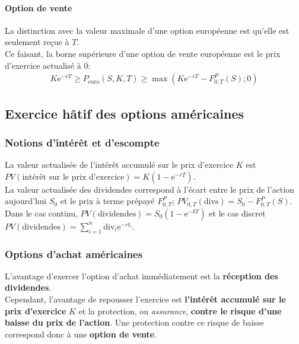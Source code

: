\documentclass[10pt, french]{article}
\begin{document}
\begin{multicols*}{2}
\paragraph{Option de vente}	La distinction avec la valeur maximale d'une option européenne est qu'elle est seulement reçue à $T$.\\

Ce faisant, \textcolor{cobalt}{la borne supérieure d'une option de vente européenne est le prix d'exercice actualisé à 0}:
\begin{align*}
	K \textrm{e}^{-rT}
	\geq	P_{\text{euro}}(S, K, T)
	\geq	\max\left(K\textrm{e}^{-rT} - F_{0, T}^{P}(S); 0\right)
\end{align*}

\columnbreak
\subsection{Exercice hâtif des options américaines}
\subsubsection*{Notions d'intérêt et d'escompte}
La valeur actualisée de l'intérêt accumulé sur le prix d'exercice $K$ est $PV(\text{intérêt sur le prix d'exercice}) = K(1 - \textrm{e}^{-rT})$.\\

La valeur actualisée des dividendes correspond à l'écart entre le prix de l'action aujourd'hui $S_{0}$ et le prix à terme prépayé $F_{0, T}^{P}$; $PV_{0, T}(\text{divs}) = S_{0} - F_{0, T}^{P}(S)$.\\

Dans le cas continu, $PV(\text{dividendes}) = S_{0} (1 - \textrm{e}^{-\delta T})$ et le cas discret $PV(\text{dividendes}) = \sum_{i = 1}^{n} \text{div}_{i} \textrm{e}^{-r t_{i}}$.

\subsubsection*{Options d'achat américaines}
L'avantage d'exercer l'option d'achat immédiatement est la \textbf{réception des dividendes}.\\

Cependant, l'avantage de repousser l'exercice est \textbf{l'intérêt accumulé sur le prix d'exercice} $K$ et la protection, ou \textit{assurance}, \textbf{contre le risque d'une baisse du prix de l'action}. Une protection contre ce risque de baisse correspond donc à une \textbf{option de vente}.\\


\end{multicols*}
\end{document}
